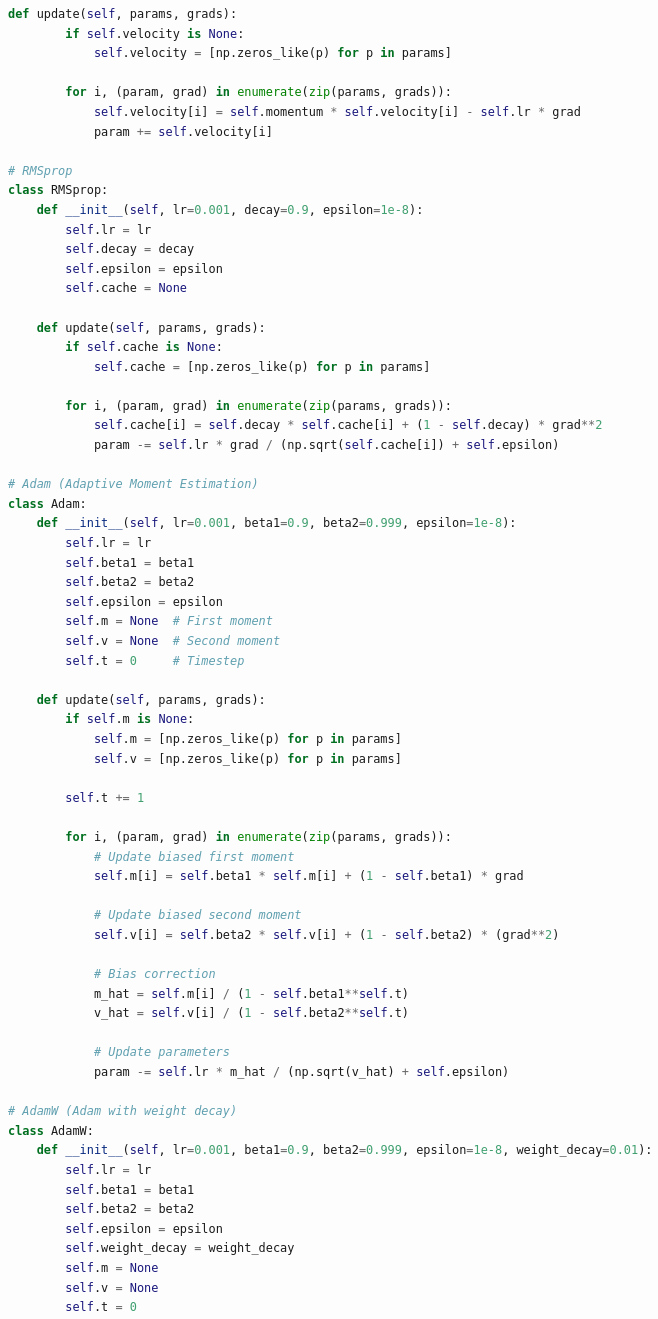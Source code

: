 \documentclass[8pt,landscape]{article}
\begin{document}
\begin{multicols}{3}
\begin{lstlisting}[language=Python]
    def update(self, params, grads):
        if self.velocity is None:
            self.velocity = [np.zeros_like(p) for p in params]

        for i, (param, grad) in enumerate(zip(params, grads)):
            self.velocity[i] = self.momentum * self.velocity[i] - self.lr * grad
            param += self.velocity[i]

# RMSprop
class RMSprop:
    def __init__(self, lr=0.001, decay=0.9, epsilon=1e-8):
        self.lr = lr
        self.decay = decay
        self.epsilon = epsilon
        self.cache = None

    def update(self, params, grads):
        if self.cache is None:
            self.cache = [np.zeros_like(p) for p in params]

        for i, (param, grad) in enumerate(zip(params, grads)):
            self.cache[i] = self.decay * self.cache[i] + (1 - self.decay) * grad**2
            param -= self.lr * grad / (np.sqrt(self.cache[i]) + self.epsilon)

# Adam (Adaptive Moment Estimation)
class Adam:
    def __init__(self, lr=0.001, beta1=0.9, beta2=0.999, epsilon=1e-8):
        self.lr = lr
        self.beta1 = beta1
        self.beta2 = beta2
        self.epsilon = epsilon
        self.m = None  # First moment
        self.v = None  # Second moment
        self.t = 0     # Timestep

    def update(self, params, grads):
        if self.m is None:
            self.m = [np.zeros_like(p) for p in params]
            self.v = [np.zeros_like(p) for p in params]

        self.t += 1

        for i, (param, grad) in enumerate(zip(params, grads)):
            # Update biased first moment
            self.m[i] = self.beta1 * self.m[i] + (1 - self.beta1) * grad

            # Update biased second moment
            self.v[i] = self.beta2 * self.v[i] + (1 - self.beta2) * (grad**2)

            # Bias correction
            m_hat = self.m[i] / (1 - self.beta1**self.t)
            v_hat = self.v[i] / (1 - self.beta2**self.t)

            # Update parameters
            param -= self.lr * m_hat / (np.sqrt(v_hat) + self.epsilon)

# AdamW (Adam with weight decay)
class AdamW:
    def __init__(self, lr=0.001, beta1=0.9, beta2=0.999, epsilon=1e-8, weight_decay=0.01):
        self.lr = lr
        self.beta1 = beta1
        self.beta2 = beta2
        self.epsilon = epsilon
        self.weight_decay = weight_decay
        self.m = None
        self.v = None
        self.t = 0


\end{lstlisting}
\end{multicols}
\end{document}
